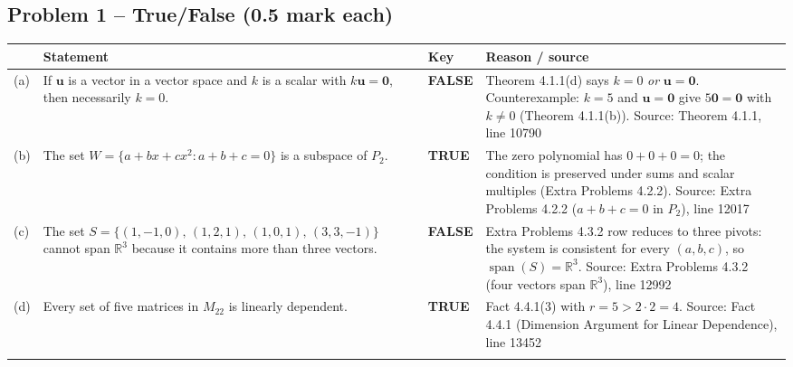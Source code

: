 \documentclass[11pt,a4paper]{article}
\newcommand{\Src}[1]{{\footnotesize\color{black!65}Source: #1}}
\begin{document}
\subsection*{Problem 1 -- True/False (0.5 mark each)}
\begin{tabularx}{\linewidth}{@{}l >{\raggedright\arraybackslash}X l >{\raggedright\arraybackslash}X@{}}\toprule & Statement & Key & Reason / source\\\midrule
(a) & If $\mathbf{u}$ is a vector in a vector space and $k$ is a scalar with $k\mathbf{u}=\mathbf{0}$, then necessarily $k=0$. & \textbf{FALSE} & Theorem 4.1.1(d) says $k=0$ \emph{or} $\mathbf{u}=\mathbf{0}$. Counterexample: $k=5$ and $\mathbf{u}=\mathbf{0}$ give $5\mathbf{0}=\mathbf{0}$ with $k\neq0$ (Theorem 4.1.1(b)). \Src{Theorem 4.1.1, line 10790}\\\addlinespace
(b) & The set $W=\{a+bx+cx^2 : a+b+c=0\}$ is a subspace of $P_2$. & \textbf{TRUE} & The zero polynomial has $0+0+0=0$; the condition is preserved under sums and scalar multiples (Extra Problems 4.2.2). \Src{Extra Problems 4.2.2 ($a+b+c=0$ in $P_2$), line 12017}\\\addlinespace
(c) & The set $S=\{(1,-1,0),\,(1,2,1),\,(1,0,1),\,(3,3,-1)\}$ cannot span $\mathbb{R}^3$ because it contains more than three vectors. & \textbf{FALSE} & Extra Problems 4.3.2 row reduces to three pivots: the system is consistent for every $(a,b,c)$, so $\operatorname{span}(S)=\mathbb{R}^3$. \Src{Extra Problems 4.3.2 (four vectors span $\mathbb{R}^3$), line 12992}\\\addlinespace
(d) & Every set of five matrices in $M_{22}$ is linearly dependent. & \textbf{TRUE} & Fact 4.4.1(3) with $r=5>2\cdot2=4$. \Src{Fact 4.4.1 (Dimension Argument for Linear Dependence), line 13452}\\\addlinespace
\bottomrule\end{tabularx}
\end{document}
